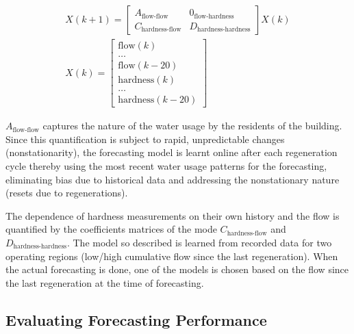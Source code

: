 \begin{gather}
X(k+1) = \begin{bmatrix}
A_{\text{flow-flow}} & 0_{\text{flow-hardness}} \\ 
C_{\text{hardness-flow}} & D_{\text{hardness-hardness}}
\end{bmatrix} X(k) \\
X(k) = \begin{bmatrix}
\text{flow}(k) \\
\dots \\
\text{flow}(k-20) \\
\text{hardness}(k) \\
\dots \\
\text{hardness}(k-20)
\end{bmatrix}
\end{gather}

$A_{\text{flow-flow}}$ captures the nature of the water usage by the residents of the building.
 Since this quantification is subject to rapid, unpredictable changes (nonstationarity), the forecasting model is learnt online after each regeneration cycle thereby using the most recent water usage patterns for the forecasting, eliminating bias due to historical data and addressing the nonstationary nature (resets due to regenerations).
 
 
The dependence of hardness measurements on their own history and the flow is quantified by the coefficients matrices of the mode $C_{\text{hardness-flow}}$ and $D_{\text{hardness-hardness}}$.
 The model so described is learned from recorded data for two operating regions (low/high cumulative flow since the last regeneration).
 When the actual forecasting is done, one of the models is chosen based on the flow since the last regeneration at the time of forecasting.

\subsection{Evaluating Forecasting Performance}
\label{sec:eval-forecasting}



% 

